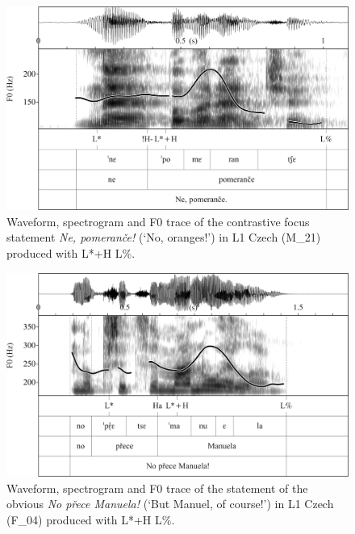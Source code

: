 \begin{figure}
\includegraphics[width=\textwidth]{figures/Figure_4.33.png}
\caption{Waveform, spectrogram and F0 trace of the contrastive focus statement \textit{Ne, pomeranče!} (‘No, oranges!’) in L1 Czech \mbox{(M\_21)} produced with L*+H L\%.}
\label{fig:4.33}
\end{figure}

\begin{figure}
\includegraphics[width=\textwidth]{figures/Figure_4.34.png}
\caption{Waveform, spectrogram and F0 trace of the statement of the obvious \textit{No přece Manuela!} (‘But Manuel, of course!’) in L1 Czech \mbox{(F\_04)} produced with L*+H L\%.}
\label{fig:4.34}
\end{figure}

